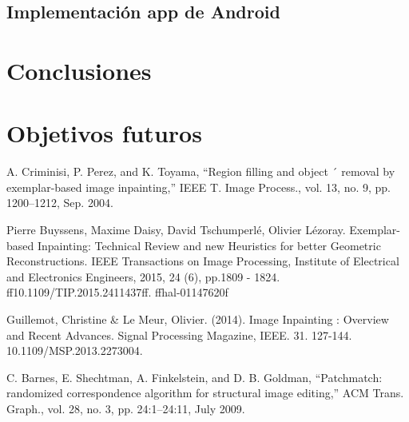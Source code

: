 \documentclass[conference]{IEEEtran}
\begin{document}
\subsection{Implementación app de Android}

\section{Conclusiones}

\section{Objetivos futuros}


\begin{thebibliography}{00}
 A. Criminisi, P. Perez, and K. Toyama, “Region filling and object ´
removal by exemplar-based image inpainting,” IEEE T. Image Process.,
vol. 13, no. 9, pp. 1200–1212, Sep. 2004.

 Pierre Buyssens, Maxime Daisy, David Tschumperlé, Olivier Lézoray. Exemplar-based Inpainting:
Technical Review and new Heuristics for better Geometric Reconstructions. IEEE Transactions on
Image Processing, Institute of Electrical and Electronics Engineers, 2015, 24 (6), pp.1809 - 1824.
ff10.1109/TIP.2015.2411437ff. ffhal-01147620f

 Guillemot, Christine \& Le Meur, Olivier. (2014). Image Inpainting : Overview and Recent Advances. Signal Processing Magazine, IEEE. 31. 127-144. 10.1109/MSP.2013.2273004. 

 C. Barnes, E. Shechtman, A. Finkelstein, and D. B. Goldman, ``Patchmatch: randomized correspondence algorithm for structural image editing,'' ACM Trans. Graph., vol. 28, no. 3, pp. 24:1–24:11, July 2009.

\end{thebibliography}
\end{document}
